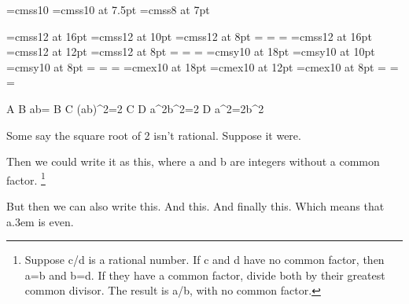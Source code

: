 \newsymbol{}
\font\mainfont=cmss10
\font\supmainfont=cmss10 at 7.5pt
\def\super#1{\raise.3em\hbox{\supmainfont#1}}
\font\footnotefont=cmss8 at 7pt
\mainfont
\frenchspacing

\font\mathfont=cmss12 at 16pt
\font\scriptmathfont=cmss12 at 10pt
\font\scriptscriptmathfont=cmss12 at 8pt
=\mathfont
{}=\scriptmathfont
{}=\scriptscriptmathfont
\font\mathfont=cmss12 at 16pt
\font\scriptmathfont=cmss12 at 12pt
\font\scriptscriptmathfont=cmss12 at 8pt
=\mathfont
{}=\scriptmathfont
{}=\scriptscriptmathfont
\font\Tensy=cmsy10 at 18pt
\font\scriptTensy=cmsy10 at 10pt
\font\scriptscriptTensy=cmsy10 at 8pt
=\Tensy
{}=\scriptTensy
{}=\scriptscriptTensy
\font\Tenex=cmex10 at 18pt
\font\scriptTenex=cmex10 at 12pt
\font\scriptscriptTenex=cmex10 at 8pt
=\Tenex
{}=\scriptTenex
{}=\scriptscriptTenex








\mathstep A B {{a\over b}=}
\mathstep B C {({a\over b})^2=2}
\mathstep C D {{a^2\over b^2}=2}
\mathstep D {} {a^2=2b^2}

\step Some say the square root of 2 isn't rational.
\step Suppose it were.

\step[A] Then we could write it as this, where a and b are
integers without a common factor.%
\footnote{%
  Suppose c/d is a rational number. If c and d have no common
  factor, then a=b and b=d. If they have a common factor,
  divide both by their greatest common divisor. The result
  is a/b, with no common factor.}

\step[B] But then we can also write this.
\step[C] And this.
\step[D] And finally this.
\step Which means that a\super2 is even.

